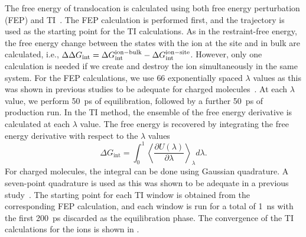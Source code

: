 The free energy of translocation is calculated using both free energy perturbation (FEP) 
and TI~\cite{Chipot2007}. The FEP calculation is performed first, and the trajectory is used as the starting 
point for the TI calculations. As in the restraint-free energy, the free energy change between 
the states with the ion at the site and in bulk are calculated, i.e., $\Delta\Delta G_{\text{int}} 
= \Delta G_{\text{int}}^{\rm ion-bulk}-\Delta G_{\text{int}}^{\rm ion-site}$.
However, only one calculation is needed if we create and destroy the ion simultaneously in the same 
system. For the FEP calculations, we use 66 exponentially spaced $\lambda$ values as this was 
shown in previous studies to be adequate for charged molecules~\cite{Heinzelmann2011}. At each $\lambda$ value, 
we perform 50~ps of equilibration, followed by a further 50~ps of production run. In the TI method, 
the ensemble of the free energy derivative is calculated at each $\lambda$ value. The free energy 
is recovered by integrating the free energy derivative with respect to the $\lambda$ values
\begin{equation}
    \Delta G_{\text{int}} = \int_{0}^{1} \left\langle \frac{\partial U(\lambda)}{\partial \lambda} 
\right\rangle_{\lambda} d\lambda .
\end{equation}
For charged molecules, the integral can be done using Gaussian quadrature. A seven-point 
quadrature is used as this was shown to be adequate in a previous study~\cite{Bastug2007}. The starting 
point for each TI window is obtained from the corresponding FEP calculation, and each window is run 
for a total of 1~ns with the first 200~ps discarded as the equilibration phase. The convergence of 
the TI calculations for the ions is shown in .

